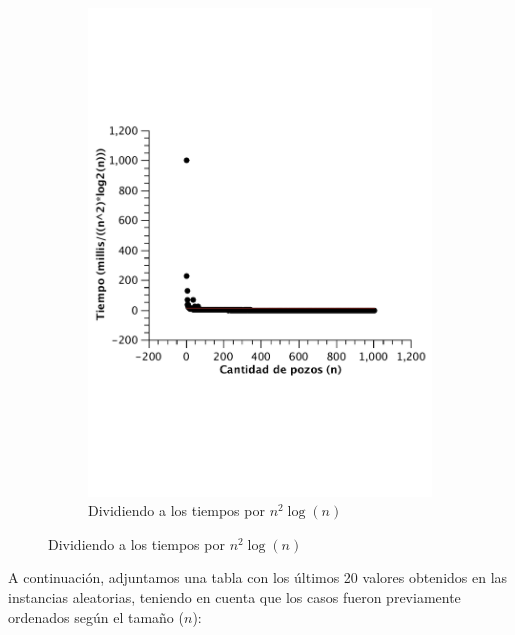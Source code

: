 \begin{figure}[H]
        \centering

        \begin{subfigure}[b]{0.5\textwidth}
                \includegraphics[width=\textwidth]{imagenes/ej3-peor-const.pdf}
                \caption{Dividiendo a los tiempos por $n^2 \log(n)$}
        \end{subfigure}

\end{figure}

A continuación, adjuntamos una tabla con los últimos 20 valores obtenidos en las instancias aleatorias, teniendo en cuenta que los casos fueron previamente ordenados según el tamaño ($n$):

